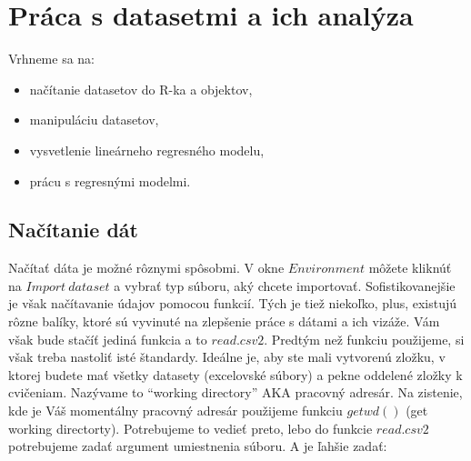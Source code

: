 \newpage

\hypertarget{pruxe1ca-s-datasetmi-a-ich-analuxfdza}{%
\section{Práca s datasetmi a ich
analýza}\label{pruxe1ca-s-datasetmi-a-ich-analuxfdza}}

Vrhneme sa na:

\begin{itemize}
\tightlist
\item
  načítanie datasetov do R-ka a objektov,
\item
  manipuláciu datasetov,
\item
  vysvetlenie lineárneho regresného modelu,
\item
  prácu s regresnými modelmi.
\end{itemize}

\hypertarget{naux10duxedtanie-duxe1t}{%
\subsection{Načítanie dát}\label{naux10duxedtanie-duxe1t}}

Načítať dáta je možné rôznymi spôsobmi. V okne \(Environment\) môžete
kliknúť na \(Import \ dataset\) a vybrať typ súboru, aký chcete
importovať. Sofistikovanejšie je však načítavanie údajov pomocou
funkcií. Tých je tiež niekoľko, plus, existujú rôzne balíky, ktoré sú
vyvinuté na zlepšenie práce s dátami a ich vizáže. Vám však bude stačíť
jediná funkcia a to \(read.csv2\). Predtým než funkciu použijeme, si
však treba nastoliť isté štandardy. Ideálne je, aby ste mali vytvorenú
zložku, v ktorej budete mať všetky datasety (excelovské súbory) a pekne
oddelené zložky k cvičeniam. Nazývame to ``working directory'' AKA
pracovný adresár. Na zistenie, kde je Váš momentálny pracovný adresár
použijeme funkciu \(getwd()\) (get working directorty). Potrebujeme to
vedieť preto, lebo do funkcie \(read.csv2\) potrebujeme zadať argument
umiestnenia súboru. A je ľahšie zadať:

\begin{Shaded}
\begin{Highlighting}[]
\NormalTok{(}\NormalTok{)}
\NormalTok{(}\NormalTok{)}
\end{Highlighting}
\end{Shaded}

